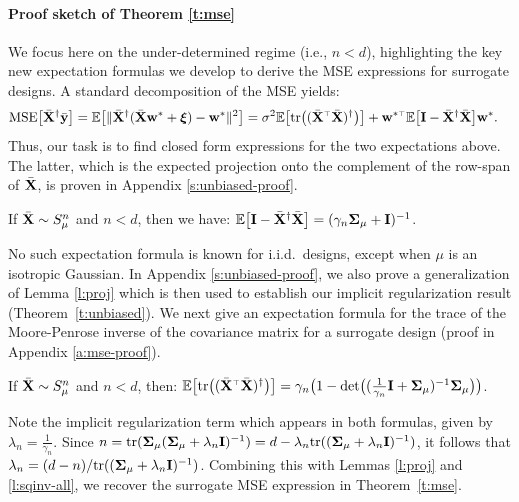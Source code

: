 \documentclass[11pt]{article}
\begin{document}
\paragraph{Proof sketch of Theorem \ref{t:mse}}
We focus here on the under-determined regime (i.e., $n<d$),
highlighting the key new expectation formulas we develop to derive the
MSE expressions for surrogate designs. A standard decomposition of the MSE yields:
\begin{align}
  \MSE{\Xb^\dagger\ybb}
   & = \E\big[\|\Xb^\dagger(\Xb\w^*+\xib)-\w^*\|^2\big]
  =\sigma^2\E\big[\tr\big((\Xb^\top\Xb)^{\dagger}\big)\big] +
  \w^{*\top}\E\big[\I-\Xb^\dagger\Xb\big]\w^*.\label{eq:mse-derivation}
\end{align}
Thus, our task is to find closed form expressions for the two
expectations above. The latter, which is the expected projection onto
the complement of the row-span of ${\bar{\mathbf X}}$, is proven in
Appendix \ref{s:unbiased-proof}.
\begin{lemma}\label{l:proj}
  If  ${\bar{\mathbf X}}\sim S_\mu^n$ and $n<d$, then we have:
  $\mathbb E\big[\mathbf I-{\bar{\mathbf X}}^\dagger{\bar{\mathbf X}}\big] = (\gamma_n\mathbf{\Sigma}_\mu+\mathbf I)^{-1}$.
\end{lemma}

\noindent
No such expectation formula is known for i.i.d.~designs, except when
$\mu$ is an isotropic Gaussian. In Appendix \ref{s:unbiased-proof}, we
also prove a generalization of Lemma \ref{l:proj} which is then used
to establish our implicit regularization result
(Theorem~\ref{t:unbiased}). We next give an expectation formula
for the trace of the Moore-Penrose inverse of the covariance
matrix for a surrogate design (proof in Appendix \ref{a:mse-proof}).
\begin{lemma}\label{l:sqinv-all}
  If  ${\bar{\mathbf X}}\sim S_\mu^n$ and $n<d$, then:
  $\E\big[\tr\big((\Xb^\top\Xb)^{\dagger}\big)\big]
    =\gamma_n\big(1-
    \det\!\big((\tfrac1{\gamma_n}\I+\Sigmab_\mu)^{-1}\Sigmab_\mu\big)\big)$.
\end{lemma}

\noindent
Note the implicit regularization term which appears in both formulas,
given by $\lambda_n=\frac1{\gamma_n}$. Since $n =
  \mathrm{tr}(\mathbf{\Sigma}_\mu(\mathbf{\Sigma}_\mu+\lambda_n\mathbf I)^{-1})=d-\lambda_n\mathrm{tr}((\mathbf{\Sigma}_\mu+\lambda_n\mathbf I)^{-1})$,
it follows that $\lambda_n=(d-n)/\mathrm{tr}((\mathbf{\Sigma}_\mu+\lambda_n\mathbf I)^{-1})$.
Combining this with Lemmas \ref{l:proj} and \ref{l:sqinv-all}, we
recover the surrogate MSE expression in Theorem~\ref{t:mse}.
\end{document}
